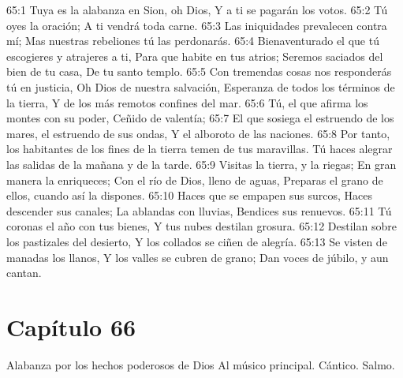 65:1 Tuya es la alabanza en Sion, oh Dios, 
Y a ti se pagarán los votos. 
65:2 Tú oyes la oración; 
A ti vendrá toda carne. 
65:3 Las iniquidades prevalecen contra mí; 
Mas nuestras rebeliones tú las perdonarás. 
65:4 Bienaventurado el que tú escogieres y atrajeres a ti, 
Para que habite en tus atrios; 
Seremos saciados del bien de tu casa, 
De tu santo templo. 
65:5 Con tremendas cosas nos responderás tú en justicia, 
Oh Dios de nuestra salvación, 
Esperanza de todos los términos de la tierra, 
Y de los más remotos confines del mar. 
65:6 Tú, el que afirma los montes con su poder, 
Ceñido de valentía; 
65:7 El que sosiega el estruendo de los mares, el estruendo de sus ondas, 
Y el alboroto de las naciones. 
65:8 Por tanto, los habitantes de los fines de la tierra temen de tus maravillas. 
Tú haces alegrar las salidas de la mañana y de la tarde. 
65:9 Visitas la tierra, y la riegas; 
En gran manera la enriqueces; 
Con el río de Dios, lleno de aguas, 
Preparas el grano de ellos, cuando así la dispones. 
65:10 Haces que se empapen sus surcos, 
Haces descender sus canales; 
La ablandas con lluvias, 
Bendices sus renuevos. 
65:11 Tú coronas el año con tus bienes, 
Y tus nubes destilan grosura. 
65:12 Destilan sobre los pastizales del desierto, 
Y los collados se ciñen de alegría. 
65:13 Se visten de manadas los llanos, 
Y los valles se cubren de grano; 
Dan voces de júbilo, y aun cantan. 
\section*{Capítulo 66}
Alabanza por los hechos poderosos de Dios 
Al músico principal. Cántico. Salmo. 
 
